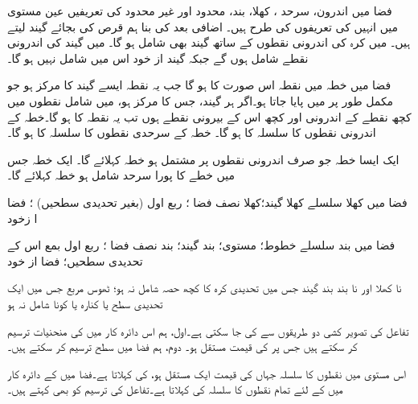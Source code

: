 فضا میں  اندرون، سرحد ، کھلا، بند، محدود  اور غیر محدود کی تعریفیں عین مستوی میں انہیں کی تعریفوں کی طرح ہیں۔ اضافی بعد کی بنا ہم قرص کی  بجائے گیند لیتے ہیں۔  میں کرہ کی اندرونی نقطوں کے ساتھ  گیند بھی شامل ہو گا۔  میں گیند کی اندرونی نقطے شامل ہوں گے جبکہ گیند از خود اس میں شامل نہیں ہو گا۔ 

فضا میں خطہ  میں نقطہ   اس صورت  کا  ہو گا جب  یہ نقطہ  ایسے گیند کا مرکز ہو جو مکمل طور پر  میں پایا جاتا ہو۔اگر ہر  گیند، جس کا مرکز     ہو، میں شامل نقطوں میں کچھ  نقطے      کے اندرونی    اور کچھ  اس کے بیرونی نقطے   ہوں تب یہ نقطہ  کا  ہو گا۔خطہ  کے اندرونی نقطوں کا  سلسلہ   کا   ہو گا۔ خطہ  کے سرحدی نقطوں کا سلسلہ  کا  ہو گا۔

ایک ایسا خطہ جو صرف اندرونی نقطوں پر مشتمل ہو   خطہ کہلائے  گا۔ ایک  خطہ جس میں خطے کا پورا سرحد شامل ہو خطہ کہلائے گا۔

\begin{description}
\item{فضا میں کھلا سلسلے}
کھلا گیند؛کھلا نصف فضا ؛ ربع اول (بغیر تحدیدی  سطحیں)  ؛ فضا  ا زخود
\item{فضا میں بند سلسلے}  
خطوط؛ مستوی؛ بند گیند؛ بند نصف فضا ؛ ربع اول بمع اس کے تحدیدی  سطحیں؛ فضا از خود
\item{نا کھلا اور نا بند}
بند گیند جس میں تحدیدی کرہ کا کچھ حصہ شامل نہ ہو؛ ٹھوس مربع جس میں ایک  تحدیدی سطح یا کنارہ   یا کونا شامل نہ ہو 
\end{description}

تفاعل    کی  تصویر کشی دو طریقوں سے کی جا سکتی ہے۔اول،   ہم اس دائرہ کار میں    کی  منحنیات ترسیم کر سکتے ہیں جس پر   کی قیمت مستقل ہو۔ دوم،    ہم فضا میں سطح  ترسیم کر سکتے ہیں۔

اس مستوی  میں  نقطوں کا سلسلہ جہاں   کی قیمت ایک مستقل    ہو،    کی   کہلاتا ہے۔فضا میں  کے دائرہ کار میں  کے لئے  تمام نقطوں  کا سلسلہ   کی  کہلاتا ہے۔تفاعل  کی ترسیم کو   بھی کہتے ہیں۔

